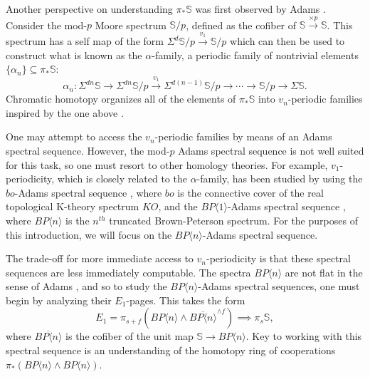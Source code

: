 \documentclass{amsart}
\theoremstyle{plain}
\numberwithin{theorem}{section}
\numberwithin{equation}{section}
\numberwithin{figure}{section}
\newcommand{\0}{\langle 0 \rangle }
\begin{document}
Another perspective on understanding $\pi_*\mathbb{S}$ was first observed by Adams \cite{Adams66}. Consider the mod-$p$ Moore spectrum $\mathbb{S}/p$, defined as the cofiber of $\mathbb{S} \xrightarrow{\times p}\mathbb{S}$. This spectrum has a self map of the form $\Sigma^d\mathbb{S}/p \xrightarrow{v_1} \mathbb{S}/p$ which can then be used to construct what is known as the $\alpha$-family, a periodic family of nontrivial elements $\{\alpha_n\} \subseteq \pi_*\mathbb{S}$:
\[\alpha_n: \Sigma^{dn}\mathbb{S} \to\Sigma^{dn}\mathbb{S}/p \xrightarrow{v_1}\Sigma^{d(n-1)}\mathbb{S}/p \to \cdots \to \mathbb{S}/p \to \Sigma\mathbb{S}.\]
Chromatic homotopy organizes all of the elements of $\pi_*\mathbb{S}$ into $v_n$-periodic families inspired by the one above \cite{MilRavWil77}. 

One may attempt to access the $v_n$-periodic families by means of an Adams spectral sequence. However, the mod-$p$ Adams spectral sequence is not well suited for this task, so one must resort to other homology theories. For example, $v_1$-periodicity, which is closely related to the $\alpha$-family, has been studied by using the $bo$-Adams spectral sequence \cite{Mahowald81,LelMah87,BBBCX}, where $bo$ is the connective cover of the real topological K-theory spectrum $KO$, and the $BP\langle 1 \rangle$-Adams spectral sequence \cite{Gonzalez00}, where $BP \langle n \rangle$ is the $n^{th}$ truncated Brown-Peterson spectrum. For the purposes of this introduction, we will focus on the $BP\langle n \rangle$-Adams spectral sequence.

The trade-off for more immediate access to $v_n$-periodicity is that these spectral sequences are less immediately computable. The spectra $BP\langle n \rangle$ are not flat in the sense of Adams \cite{Adams74}, and so to study the $BP\langle n \rangle$-Adams spectral sequences, one must begin by analyzing their $E_1$-pages. This takes the form
\[E_1 = \pi_{s+f}(BP\langle n \rangle \wedge \overline{BP \langle n \rangle}^{\wedge f}) \implies \pi_s\mathbb{S},\]
where $\overline{BP \langle n \rangle}$ is the cofiber of the unit map $\mathbb{S} \to BP \langle n \rangle$. Key to working with this spectral sequence is an understanding of the homotopy ring of cooperations  $\pi_{*}(BP\langle n \rangle \wedge BP \langle n \rangle)$. 
\end{document}
